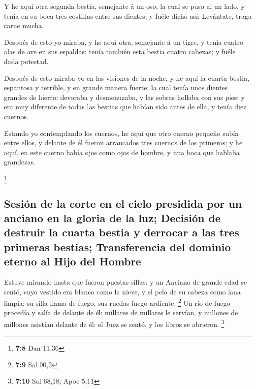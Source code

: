  Y he aquí otra segunda bestia, semejante á un oso, la
cual se puso al un lado, y tenía en su boca tres costillas entre sus
dientes; y fuéle dicho así: Levántate, traga carne mucha.

 Después de esto yo miraba, y he aquí otra, semejante á un
tigre, y tenía cuatro alas de ave en sus espaldas: tenía también esta
bestia cuatro cabezas; y fuéle dada potestad.

 Después de esto miraba yo en las visiones de la noche, y
he aquí la cuarta bestia, espantosa y terrible, y en grande manera
fuerte; la cual tenía unos dientes grandes de hierro: devoraba y
desmenuzaba, y las sobras hollaba con sus pies: y era muy diferente de
todas las bestias que habían sido antes de ella, y tenía diez cuernos.

 Estando yo contemplando los cuernos, he aquí que otro
cuerno pequeño subía entre ellos, y delante de él fueron arrancados tres
cuernos de los primeros; y he aquí, en este cuerno había ojos como ojos
de hombre, y una boca que hablaba grandezas.

\footnote{\textbf{7:8} Dan 11,36}

\hypertarget{sesiuxf3n-de-la-corte-en-el-cielo-presidida-por-un-anciano-en-la-gloria-de-la-luz-decisiuxf3n-de-destruir-la-cuarta-bestia-y-derrocar-a-las-tres-primeras-bestias-transferencia-del-dominio-eterno-al-hijo-del-hombre}{%
\subsection{Sesión de la corte en el cielo presidida por un anciano en
la gloria de la luz; Decisión de destruir la cuarta bestia y derrocar a
las tres primeras bestias; Transferencia del dominio eterno al Hijo del
Hombre}\label{sesiuxf3n-de-la-corte-en-el-cielo-presidida-por-un-anciano-en-la-gloria-de-la-luz-decisiuxf3n-de-destruir-la-cuarta-bestia-y-derrocar-a-las-tres-primeras-bestias-transferencia-del-dominio-eterno-al-hijo-del-hombre}}

 Estuve mirando hasta que fueron puestas sillas: y un
Anciano de grande edad se sentó, cuyo vestido era blanco como la nieve,
y el pelo de su cabeza como lana limpia; su silla llama de fuego, sus
ruedas fuego ardiente. \footnote{\textbf{7:9} Sal 90,2} 
Un río de fuego procedía y salía de delante de él: millares de millares
le servían, y millones de millones asistían delante de él: el Juez se
sentó, y los libros se abrieron. \footnote{\textbf{7:10} Sal 68,18; Apoc
  5,11}

